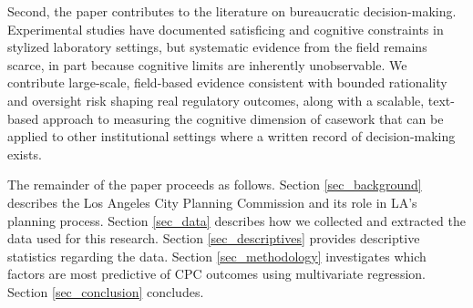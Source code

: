 

Second, the paper contributes to the literature on bureaucratic decision-making. Experimental studies have documented satisficing and cognitive constraints in stylized laboratory settings, but systematic evidence from the field remains scarce, in part because cognitive limits are inherently unobservable. We contribute large-scale, field-based evidence consistent with bounded rationality and oversight risk shaping real regulatory outcomes, along with a scalable, text-based approach to measuring the cognitive dimension of casework that can be applied to other institutional settings where a written record of decision-making exists.

The remainder of the paper proceeds as follows. 
Section \ref{sec_background} describes the Los Angeles City Planning Commission and its role in LA's planning process. Section \ref{sec_data} describes how we collected and extracted the data used for this research. Section \ref{sec_descriptives} provides descriptive statistics regarding the data. Section \ref{sec_methodology} investigates which factors are most predictive of CPC outcomes using multivariate regression. Section \ref{sec_conclusion} concludes.



